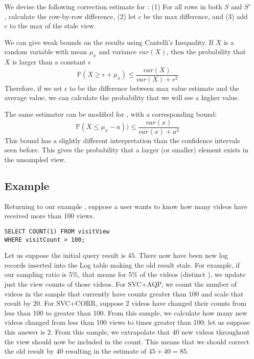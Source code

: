 We devise the following correction estimate for \maxfunc: (1) For all rows in both $S$ and $S'$, calculate the row-by-row difference, (2) let $c$ be the max difference, and (3) add $c$ to the max of the stale view.

We can give weak bounds on the results using Cantelli's Inequality.
If $X$ is a random variable with mean $\mu_x$ and variance $var(X)$, then the probability that $X$ is larger than a constant $\epsilon$ 
\[
\mathbb{P}(X \ge \epsilon + \mu_x ) \le \frac{var(X)}{var(X) + \epsilon^2}
\]
Therefore, if we set $\epsilon$ to be the difference between max value estimate and the average value, we can calculate the probability that we will see a higher value. 

The same estimator can be modified for \minfunc, with a corresponding bound:
\[
\mathbb{P}(X \le \mu_x - a )) \le \frac{var(x)}{var(x) + a^2}
\]
This bound has a slightly different interpretation than the confidence intervals seen before.
This gives the probability that a larger (or smaller) element exists in the unsampled view.

\subsection{Example}
Returning to our example , suppose a user wants to know how many videos have received more than 100 views.
\begin{lstlisting}[basicstyle={\scriptsize}]
SELECT COUNT(1) FROM visitView 
WHERE visitCount > 100;
\end{lstlisting}
Let us suppose the initial query result is $45$.
There now have been new log records inserted into the Log table making the old result stale.
For example, if our sampling ratio is 5\%, that means for 5\% of the videos (distinct ), we update just the view counts of those videos.
For SVC+AQP, we count the number of videos in the sample that currently have counts greater than 100 and scale that result by 20.
For SVC+CORR, suppose 2 videos have changed their counts from less than 100 to greater than 100.
From this sample, we calculate how many new videos changed from less than 100 views to times greater than 100; let us suppose this answer is $2$.
From this sample, we extrapolate that $40$ new videos throughout the view should now be included in the count.
This means that we should correct the old result by $40$ resulting in the estimate of $45+40 = 85$.

